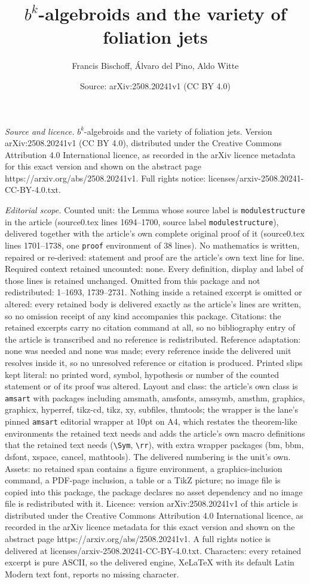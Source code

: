 \documentclass[10pt,a4paper]{amsart}
\title[$b^k$-algebroids and the variety of foliation jets]{$b^k$-algebroids and the variety of foliation jets}
\author{Francis Bischoff, \'Alvaro del Pino, Aldo Witte}
\date{Source: arXiv:2508.20241v1 (CC BY 4.0)}
\begin{document}
\maketitle

\noindent\emph{Source and licence.} $b^k$-algebroids and the variety of foliation jets. Version arXiv:2508.20241v1 (CC BY 4.0), distributed under the Creative Commons Attribution 4.0 International licence, as recorded in the arXiv licence metadata for this exact version and shown on the abstract page https://arxiv.org/abs/2508.20241v1. Full rights notice: licenses/arxiv-2508.20241-CC-BY-4.0.txt.\par\smallskip

\noindent\textit{Editorial scope.} Counted unit: the Lemma whose source label is \texttt{modulestructure} in the article (source0.tex lines 1694--1700, source label \texttt{modulestructure}), delivered together with the article's own complete original proof of it (source0.tex lines 1701--1738, one \texttt{proof} environment of 38 lines). No mathematics is written, repaired or re-derived: statement and proof are the article's own text line for line. Required context retained uncounted: none. Every definition, display and label of those lines is retained unchanged. Omitted from this package and not redistributed: 1--1693, 1739--2731. Nothing inside a retained excerpt is omitted or altered: every retained body is delivered exactly as the article's lines are written, so no omission receipt of any kind accompanies this package. Citations: the retained excerpts carry no citation command at all, so no bibliography entry of the article is transcribed and no reference is redistributed. Reference adaptation: none was needed and none was made; every reference inside the delivered unit resolves inside it, so no unresolved reference or citation is produced. Printed slips kept literal: no printed word, symbol, hypothesis or number of the counted statement or of its proof was altered. Layout and class: the article's own class is \texttt{amsart} with packages including amsmath, amsfonts, amssymb, amsthm, graphics, graphicx, hyperref, tikz-cd, tikz, xy, subfiles, thmtools; the wrapper is the lane's pinned \texttt{amsart} editorial wrapper at 10pt on A4, which restates the theorem-like environments the retained text needs and adds the article's own macro definitions that the retained text needs (\texttt{\textbackslash Sym}, \texttt{\textbackslash rr}), with extra wrapper packages (bm, bbm, dsfont, xspace, cancel, mathtools). The delivered numbering is the unit's own. Assets: no retained span contains a figure environment, a graphics-inclusion command, a PDF-page inclusion, a table or a TikZ picture; no image file is copied into this package, the package declares no asset dependency and no image file is redistributed with it. Licence: version arXiv:2508.20241v1 of this article is distributed under the Creative Commons Attribution 4.0 International licence, as recorded in the arXiv licence metadata for this exact version and shown on the abstract page https://arxiv.org/abs/2508.20241v1. A full rights notice is delivered at licenses/arxiv-2508.20241-CC-BY-4.0.txt. Characters: every retained excerpt is pure ASCII, so the delivered engine, XeLaTeX with its default Latin Modern text font, reports no missing character.
\end{document}

